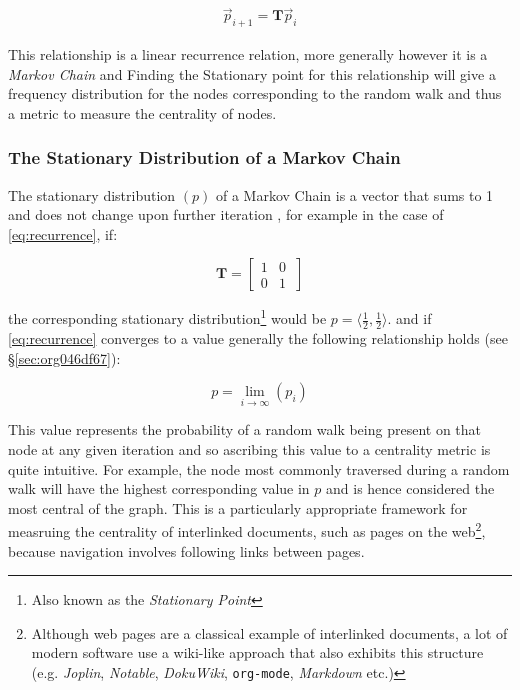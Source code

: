 \documentclass[11pt, twoside]{report}
\begin{document}
\begin{align}
\vec{p}_{i+1} = \mathbf{T}\vec{p}_{i} \label{eq:recurrence}
\end{align}

This relationship is a linear recurrence relation, more generally however it is
a \emph{Markov Chain} \cite[\S 4.4]{langvilleGooglePageRankScience2012} and
Finding the Stationary point for this relationship will give a frequency
distribution for the nodes corresponding to the random walk and thus a metric to
measure the centrality of nodes.

\subsubsection{The Stationary Distribution of a Markov Chain}
The stationary distribution \(\left(p\right)\) of a Markov Chain is a vector that sums to 1 and
does not change upon further iteration \cite[\S 1.1.7]{chingMarkovChainsModels2006}, for example in the case of \eqref{eq:recurrence}, if:

\[
  \mathbf{T} =
  \begin{bmatrix}
    1 & 0 \\
    0 & 1 \
  \end{bmatrix}
\]

the corresponding stationary distribution\footnote{Also
  known as the \textit{Stationary Point}} would be \(p = \langle \frac{1}{2}, \frac{1}{2} \rangle\).
and if \eqref{eq:recurrence} converges to a value generally the following relationship holds (see \S \ref{sec:org046df67}):

\[
  p = \lim_{i \rightarrow \infty} \left(p_{i}\right)
\]

This value represents the probability of a random walk being present on that
node at any given iteration and so ascribing this value to a centrality metric
is quite intuitive. For example, the node most commonly traversed during a random walk
will have the highest corresponding value in \(p\) and is hence considered the
most central of the graph. This is a particularly appropriate framework for
measruing the centrality of interlinked documents, such as pages on the
web\footnote{Although web pages are a classical example of interlinked
  documents, a lot of modern software use a wiki-like approach that also exhibits
  this structure (e.g. \textit{Joplin}, \textit{Notable}, \textit{DokuWiki},
  \texttt{org-mode}, \textit{Markdown} etc.) }, because navigation involves
following links between pages.
\end{document}
